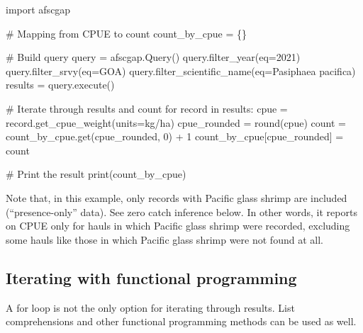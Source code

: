 \documentclass[
  letterpaper,
  oneside,
  open=any]{scrbook}
\newenvironment{Shaded}{\begin{snugshade}}{\end{snugshade}}
\newcommand{\AttributeTok}[1]{\textcolor[rgb]{0.40,0.45,0.13}{#1}}
\newcommand{\CommentTok}[1]{\textcolor[rgb]{0.37,0.37,0.37}{#1}}
\newcommand{\ControlFlowTok}[1]{\textcolor[rgb]{0.00,0.23,0.31}{#1}}
\newcommand{\DecValTok}[1]{\textcolor[rgb]{0.68,0.00,0.00}{#1}}
\newcommand{\FunctionTok}[1]{\textcolor[rgb]{0.28,0.35,0.67}{#1}}
\newcommand{\NormalTok}[1]{\textcolor[rgb]{0.00,0.23,0.31}{#1}}
\newcommand{\OtherTok}[1]{\textcolor[rgb]{0.00,0.23,0.31}{#1}}
\newcommand{\SpecialCharTok}[1]{\textcolor[rgb]{0.37,0.37,0.37}{#1}}
\newcommand{\StringTok}[1]{\textcolor[rgb]{0.13,0.47,0.30}{#1}}
\begin{document}
\begin{Shaded}
\begin{Highlighting}[]
\NormalTok{import afscgap}

\CommentTok{\# Mapping from CPUE to count}
\NormalTok{count\_by\_cpue }\OtherTok{=}\NormalTok{ \{\}}

\CommentTok{\# Build query}
\NormalTok{query }\OtherTok{=} \FunctionTok{afscgap.Query}\NormalTok{()}
\FunctionTok{query.filter\_year}\NormalTok{(}\AttributeTok{eq=}\DecValTok{2021}\NormalTok{)}
\FunctionTok{query.filter\_srvy}\NormalTok{(}\AttributeTok{eq=}\StringTok{\textquotesingle{}GOA\textquotesingle{}}\NormalTok{)}
\FunctionTok{query.filter\_scientific\_name}\NormalTok{(}\AttributeTok{eq=}\StringTok{\textquotesingle{}Pasiphaea pacifica\textquotesingle{}}\NormalTok{)}
\NormalTok{results }\OtherTok{=} \FunctionTok{query.execute}\NormalTok{()}

\CommentTok{\# Iterate through results and count}
\ControlFlowTok{for}\NormalTok{ record }\ControlFlowTok{in}\NormalTok{ results}\SpecialCharTok{:}
\NormalTok{  cpue }\OtherTok{=} \FunctionTok{record.get\_cpue\_weight}\NormalTok{(}\AttributeTok{units=}\StringTok{\textquotesingle{}kg/ha\textquotesingle{}}\NormalTok{)}
\NormalTok{  cpue\_rounded }\OtherTok{=} \FunctionTok{round}\NormalTok{(cpue)}
\NormalTok{  count }\OtherTok{=} \FunctionTok{count\_by\_cpue.get}\NormalTok{(cpue\_rounded, }\DecValTok{0}\NormalTok{) }\SpecialCharTok{+} \DecValTok{1}
\NormalTok{  count\_by\_cpue[cpue\_rounded] }\OtherTok{=}\NormalTok{ count}

\CommentTok{\# Print the result}
\FunctionTok{print}\NormalTok{(count\_by\_cpue)}
\end{Highlighting}
\end{Shaded}

Note that, in this example, only records with Pacific glass shrimp are
included (``presence-only'' data). See zero catch inference below. In
other words, it reports on CPUE only for hauls in which Pacific glass
shrimp were recorded, excluding some hauls like those in which Pacific
glass shrimp were not found at all.

\subsection{Iterating with functional
programming}\label{iterating-with-functional-programming}

A for loop is not the only option for iterating through results. List
comprehensions and other functional programming methods can be used as
well.
\end{document}
